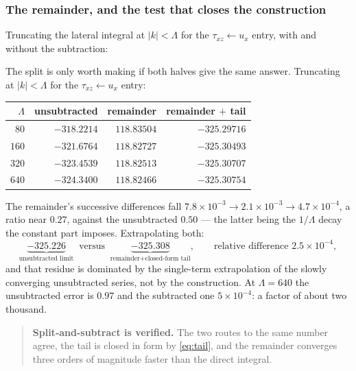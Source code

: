 \documentclass[11pt,a4paper]{article}
\begin{document}
\subsubsection{The remainder, and the test that closes the construction}

Truncating the lateral integral at $|k| < \Lambda$ for the
$\tau_{xz}\!\leftarrow\!u_x$ entry, with and without the subtraction:

The split is only worth making if both halves give the same answer.  Truncating
at $|k| < \Lambda$ for the $\tau_{xz}\!\leftarrow\!u_x$ entry:

\begin{center}
\begin{tabular}{rrrr}
\toprule
$\Lambda$ & unsubtracted & remainder & remainder $+$ tail\\
\midrule
$80$  & $-318.2214$ & $118.83504$ & $-325.29716$\\
$160$ & $-321.6764$ & $118.82727$ & $-325.30493$\\
$320$ & $-323.4539$ & $118.82513$ & $-325.30707$\\
$640$ & $-324.3400$ & $118.82466$ & $-325.30754$\\
\bottomrule
\end{tabular}
\end{center}

The remainder's successive differences fall $7.8\times10^{-3} \to
2.1\times10^{-3} \to 4.7\times10^{-4}$, a ratio near $0.27$, against the
unsubtracted $0.50$ --- the latter being the $1/\Lambda$ decay the constant part
imposes.  Extrapolating both:
\begin{equation}\label{eq:closure}
  \underbrace{-325.226}_{\text{unsubtracted limit}}
  \;\;\text{versus}\;\;
  \underbrace{-325.308}_{\text{remainder} + \text{closed-form tail}},
  \qquad \text{relative difference } 2.5\times10^{-4},
\end{equation}
and that residue is dominated by the single-term extrapolation of the slowly
converging unsubtracted series, not by the construction.  At $\Lambda = 640$ the
unsubtracted error is $0.97$ and the subtracted one $5\times10^{-4}$: a factor
of about two thousand.

\begin{quote}
\textbf{Split-and-subtract is verified.}  The two routes to the same number
agree, the tail is closed in form by \eqref{eq:tail}, and the remainder converges
three orders of magnitude faster than the direct integral.
\end{quote}
\end{document}
